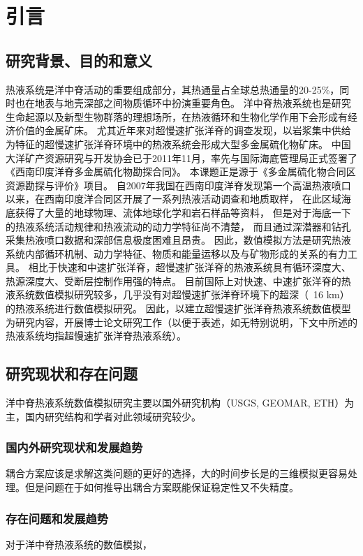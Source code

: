 
\chapter{引言}

\section{研究背景、目的和意义}
热液系统是洋中脊活动的重要组成部分，其热通量占全球总热通量的20-25\%，同时也在地表与地壳深部之间物质循环中扮演重要角色。
洋中脊热液系统也是研究生命起源以及新型生物群落的理想场所，在热液循环和生物化学作用下会形成有经济价值的金属矿床。
尤其近年来对超慢速扩张洋脊的调查发现，以岩浆集中供给为特征的超慢速扩张洋脊环境中的热液系统会形成大型多金属硫化物矿床。
中国大洋矿产资源研究与开发协会已于2011年11月，率先与国际海底管理局正式签署了《西南印度洋脊多金属硫化物勘探合同》。
本课题正是源于《多金属硫化物合同区资源勘探与评价》项目。
自2007年我国在西南印度洋脊发现第一个高温热液喷口以来，在西南印度洋合同区开展了一系列热液活动调查和地质取样，
在此区域海底获得了大量的地球物理、流体地球化学和岩石样品等资料，
但是对于海底一下的热液系统活动规律和热液流动的动力学特征尚不清楚，
而且通过深潜器和钻孔采集热液喷口数据和深部信息极度困难且昂贵。
因此，数值模拟方法是研究热液系统内部循环机制、动力学特征、物质和能量运移以及与矿物形成的关系的有力工具。
相比于快速和中速扩张洋脊，超慢速扩张洋脊的热液系统具有循环深度大、热源深度大、受断层控制作用强的特点。
目前国际上对快速、中速扩张洋脊的热液系统数值模拟研究较多，几乎没有对超慢速扩张洋脊环境下的超深（~16 km）的热液系统进行数值模拟研究。
因此，以建立超慢速扩张洋脊热液系统数值模型为研究内容，开展博士论文研究工作（以便于表述，如无特别说明，下文中所述的热液系统均指超慢速扩张洋脊热液系统）。


\section{研究现状和存在问题}
洋中脊热液系统数值模拟研究主要以国外研究机构（USGS, GEOMAR, ETH）为主，国内研究结构和学者对此领域研究较少。

\subsection{国内外研究现状和发展趋势}


耦合方案应该是求解这类问题的更好的选择，大的时间步长是的三维模拟更容易处理。但是问题在于如何推导出耦合方案既能保证稳定性又不失精度。

\subsection{存在问题和发展趋势}
对于洋中脊热液系统的数值模拟，


